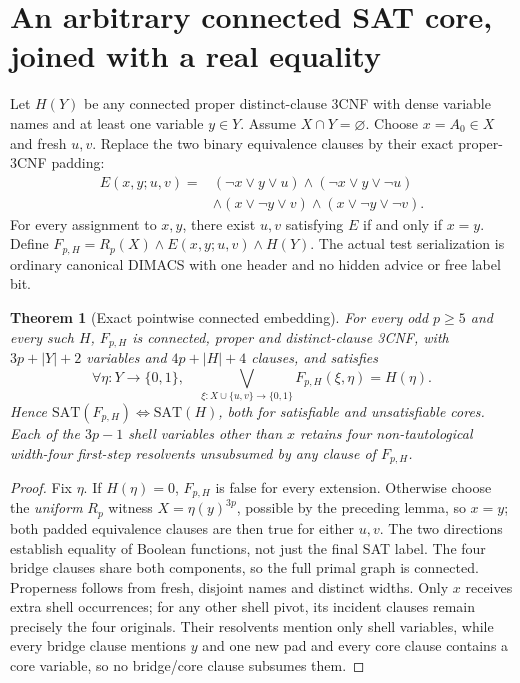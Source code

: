 \documentclass[11pt]{article}
\newtheorem{theorem}{Theorem}
\begin{document}
\section{An arbitrary connected SAT core, joined with a real equality}
Let $H(Y)$ be any connected proper distinct-clause 3CNF with dense variable names and at least one variable $y\in Y$. Assume $X\cap Y=\varnothing$. Choose $x=A_0\in X$ and fresh $u,v$. Replace the two binary equivalence clauses by their exact proper-3CNF padding:
\[
\begin{split}
E(x,y;u,v)={}&(\neg x\lor y\lor u)\land(\neg x\lor y\lor\neg u)\\
&\land(x\lor\neg y\lor v)\land(x\lor\neg y\lor\neg v).
\end{split}
\]
For every assignment to $x,y$, there exist $u,v$ satisfying $E$ if and only if $x=y$. Define $F_{p,H}=R_p(X)\land E(x,y;u,v)\land H(Y)$. The actual test serialization is ordinary canonical DIMACS with one header and no hidden advice or free label bit.

\begin{theorem}[Exact pointwise connected embedding]
For every odd $p\ge5$ and every such $H$, $F_{p,H}$ is connected, proper and distinct-clause 3CNF, with $3p+|Y|+2$ variables and $4p+|H|+4$ clauses, and satisfies
\[
\boxed{\ \forall\eta:Y\to\{0,1\},\quad
\bigvee_{\xi:X\cup\{u,v\}\to\{0,1\}}
 F_{p,H}(\xi,\eta)=H(\eta).\ }
\]
Hence $\mathrm{SAT}(F_{p,H})\iff\mathrm{SAT}(H)$, both for satisfiable and unsatisfiable cores. Each of the $3p-1$ shell variables other than $x$ retains four non-tautological width-four first-step resolvents unsubsumed by any clause of $F_{p,H}$.
\end{theorem}
\begin{proof}
Fix $\eta$. If $H(\eta)=0$, $F_{p,H}$ is false for every extension. Otherwise choose the \emph{uniform} $R_p$ witness $X=\eta(y)^{3p}$, possible by the preceding lemma, so $x=y$; both padded equivalence clauses are then true for either $u,v$. The two directions establish equality of Boolean functions, not just the final SAT label. The four bridge clauses share both components, so the full primal graph is connected. Properness follows from fresh, disjoint names and distinct widths. Only $x$ receives extra shell occurrences; for any other shell pivot, its incident clauses remain precisely the four originals. Their resolvents mention only shell variables, while every bridge clause mentions $y$ and one new pad and every core clause contains a core variable, so no bridge/core clause subsumes them.
\end{proof}
\end{document}
